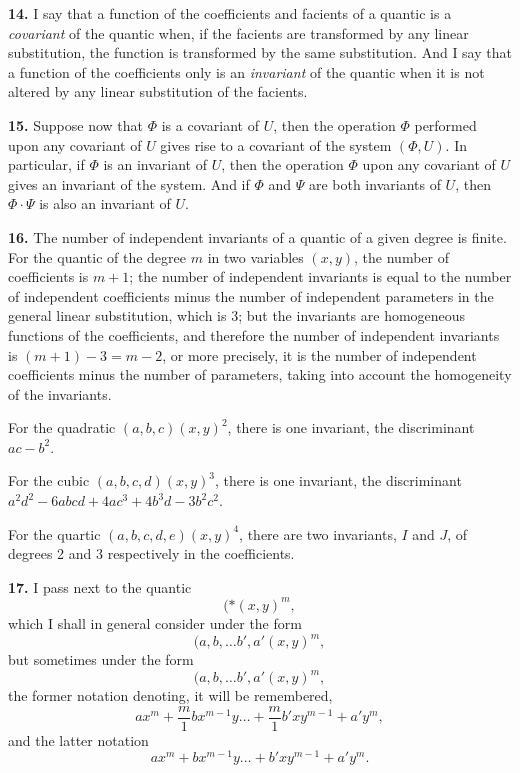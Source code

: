 \documentclass[12pt,a4paper]{article}
\begin{document}
\textbf{14.} I say that a function of the coefficients and facients of a quantic is a \textit{covariant} of the quantic when, if the facients are transformed by any linear substitution, the function is transformed by the same substitution. And I say that a function of the coefficients only is an \textit{invariant} of the quantic when it is not altered by any linear substitution of the facients.

\textbf{15.} Suppose now that $\Phi$ is a covariant of $U$, then the operation $\Phi$ performed upon any covariant of $U$ gives rise to a covariant of the system $(\Phi, U)$. In particular, if $\Phi$ is an invariant of $U$, then the operation $\Phi$ upon any covariant of $U$ gives an invariant of the system. And if $\Phi$ and $\Psi$ are both invariants of $U$, then $\Phi \cdot \Psi$ is also an invariant of $U$.

\newpage
\setcounter{page}{229}

\textbf{16.} The number of independent invariants of a quantic of a given degree is finite. For the quantic of the degree $m$ in two variables $(x, y)$, the number of coefficients is $m+1$; the number of independent invariants is equal to the number of independent coefficients minus the number of independent parameters in the general linear substitution, which is 3; but the invariants are homogeneous functions of the coefficients, and therefore the number of independent invariants is $(m+1) - 3 = m - 2$, or more precisely, it is the number of independent coefficients minus the number of parameters, taking into account the homogeneity of the invariants.

For the quadratic $(a, b, c)(x, y)^2$, there is one invariant, the discriminant $ac - b^2$.

For the cubic $(a, b, c, d)(x, y)^3$, there is one invariant, the discriminant $a^2d^2 - 6abcd + 4ac^3 + 4b^3d - 3b^2c^2$.

For the quartic $(a, b, c, d, e)(x, y)^4$, there are two invariants, $I$ and $J$, of degrees 2 and 3 respectively in the coefficients.

\textbf{17.} I pass next to the quantic
\[
(*\!\!\!\!\!(x, y)^m,
\]
which I shall in general consider under the form
\[
(a, b, \ldots b', a' \!\!\!\!(x, y)^m,
\]
but sometimes under the form
\[
(a, b, \ldots b', a' \!\!\!\!(x, y)^m,
\]
the former notation denoting, it will be remembered,
\[
ax^m + \frac{m}{1} bx^{m-1}y \ldots + \frac{m}{1} b'xy^{m-1} + a'y^m,
\]
and the latter notation
\[
ax^m + bx^{m-1}y \ldots + b'xy^{m-1} + a'y^m.
\]
\end{document}
